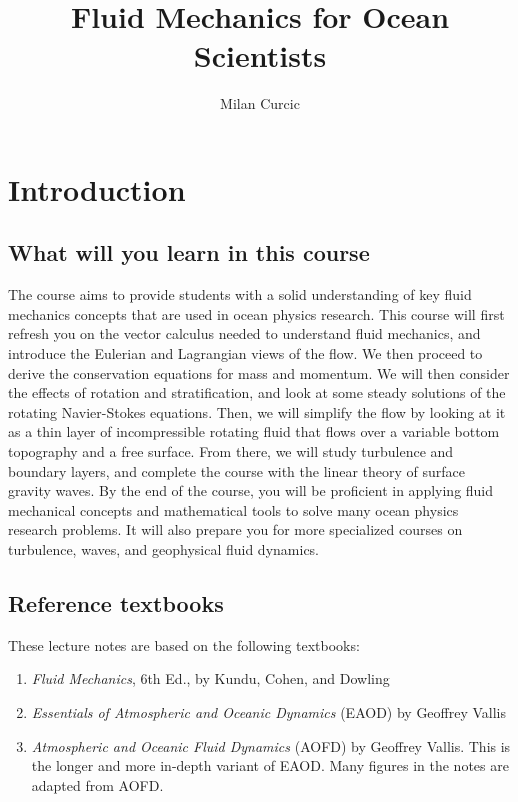 \documentclass[12pt]{article}
\numberwithin{equation}{section}
\numberwithin{figure}{section}
\numberwithin{table}{section}
\begin{document}
\title{Fluid Mechanics for Ocean Scientists}
\author{Milan Curcic}
\date{}

\maketitle

\tableofcontents

\newpage
\section{Introduction}

\subsection{What will you learn in this course}

The course aims to provide students with a solid understanding of key fluid
mechanics concepts that are used in ocean physics research.
This course will first refresh you on the vector calculus needed to understand
fluid mechanics, and introduce the Eulerian and Lagrangian views of the flow.
We then proceed to derive the conservation equations for mass and momentum.
We will then consider the effects of rotation and stratification, and look
at some steady solutions of the rotating Navier-Stokes equations.
Then, we will simplify the flow by looking at it as a thin layer of
incompressible rotating fluid that flows over a variable bottom topography
and a free surface.
From there, we will study turbulence and boundary layers, and complete the
course with the linear theory of surface gravity waves.
By the end of the course, you will be proficient in applying fluid mechanical
concepts and mathematical tools to solve many ocean physics research problems.
It will also prepare you for more specialized courses on turbulence, waves,
and geophysical fluid dynamics.

\subsection{Reference textbooks}

These lecture notes are based on the following textbooks:

\begin{enumerate}
  \item \textit{Fluid Mechanics}, 6th Ed., by Kundu, Cohen, and Dowling
  \item \textit{Essentials of Atmospheric and Oceanic Dynamics} (EAOD) by Geoffrey Vallis
  \item \textit{Atmospheric and Oceanic Fluid Dynamics} (AOFD) by Geoffrey Vallis.
  This is the longer and more in-depth variant of EAOD.
  Many figures in the notes are adapted from AOFD.
\end{enumerate}
\end{document}
